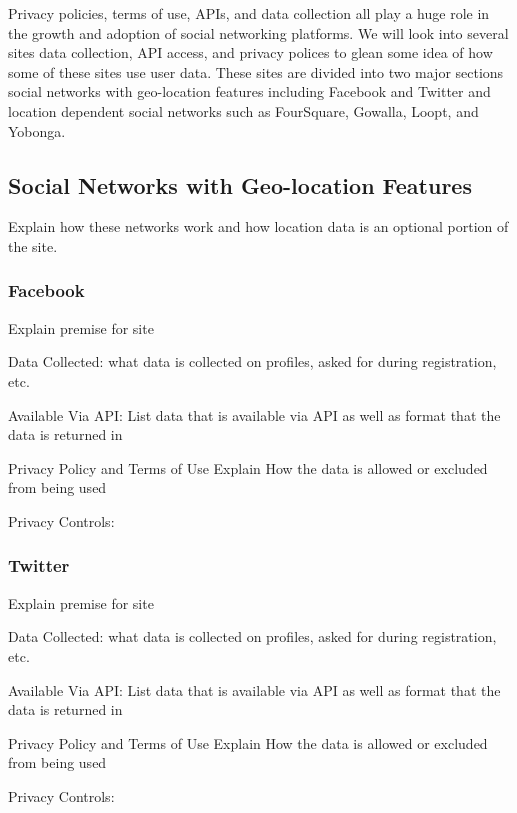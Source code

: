 Privacy policies, terms of use, APIs, and data collection all play a huge role
in the growth and adoption of social networking platforms. We will look into
several sites data collection, API access, and privacy polices to glean some
idea of how some of these sites use user data. These sites are divided into two
major sections social networks with geo-location features including Facebook and
Twitter and location dependent social networks such as FourSquare, Gowalla,
Loopt, and Yobonga.

\subsection{Social Networks with Geo-location Features}
Explain how these networks work and how location data is an optional portion of
the site.

\subsubsection{Facebook}
Explain premise for site

Data Collected:
what data is collected on profiles, asked for during registration, etc.

Available Via API:
List data that is available via API as well as format that the data is returned
in

Privacy Policy and Terms of Use
Explain How the data is allowed or excluded from being used

Privacy Controls:
\subsubsection{Twitter}
Explain premise for site

Data Collected:
what data is collected on profiles, asked for during registration, etc.

Available Via API:
List data that is available via API as well as format that the data is returned
in

Privacy Policy and Terms of Use
Explain How the data is allowed or excluded from being used

Privacy Controls:

